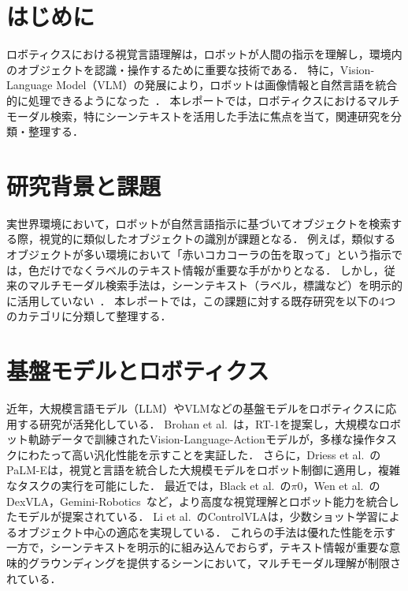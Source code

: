 \section{はじめに}
ロボティクスにおける視覚言語理解は，ロボットが人間の指示を理解し，環境内のオブジェクトを認識・操作するために重要な技術である．
特に，Vision-Language Model（VLM）の発展により，ロボットは画像情報と自然言語を統合的に処理できるようになった~\cite{brohan2023saycan, brohan2022rt, XIAO2025129963, Ma2024ASO}．
本レポートでは，ロボティクスにおけるマルチモーダル検索，特にシーンテキストを活用した手法に焦点を当て，関連研究を分類・整理する．

\section{研究背景と課題}
実世界環境において，ロボットが自然言語指示に基づいてオブジェクトを検索する際，視覚的に類似したオブジェクトの識別が課題となる．
例えば，類似するオブジェクトが多い環境において「赤いコカコーラの缶を取って」という指示では，色だけでなくラベルのテキスト情報が重要な手がかりとなる．
しかし，従来のマルチモーダル検索手法は，シーンテキスト（ラベル，標識など）を明示的に活用していない~\cite{Long2018SceneTD, Gupta2022}．
本レポートでは，この課題に対する既存研究を以下の4つのカテゴリに分類して整理する．

\section{基盤モデルとロボティクス}
近年，大規模言語モデル（LLM）やVLMなどの基盤モデルをロボティクスに応用する研究が活発化している．
Brohan et al.~\cite{brohan2022rt}は，RT-1を提案し，大規模なロボット軌跡データで訓練されたVision-Language-Actionモデルが，多様な操作タスクにわたって高い汎化性能を示すことを実証した．
さらに，Driess et al.~\cite{Driess2023PaLMEAE}のPaLM-Eは，視覚と言語を統合した大規模モデルをロボット制御に適用し，複雑なタスクの実行を可能にした．
最近では，Black et al.~\cite{Black2025pi05}の$\pi$0，Wen et al.~\cite{wen2025dexvla}のDexVLA，Gemini-Robotics~\cite{team2025gemini}など，より高度な視覚理解とロボット能力を統合したモデルが提案されている．
Li et al.~\cite{li2025controlvla}のControlVLAは，少数ショット学習によるオブジェクト中心の適応を実現している．
これらの手法は優れた性能を示す一方で，シーンテキストを明示的に組み込んでおらず，テキスト情報が重要な意味的グラウンディングを提供するシーンにおいて，マルチモーダル理解が制限されている．

